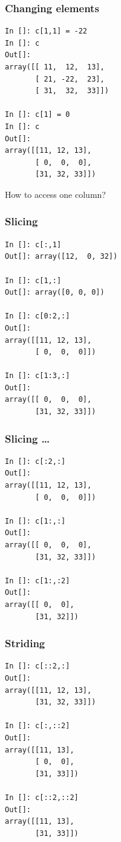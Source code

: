 \documentclass[14pt,compress]{beamer}
\begin{document}
\begin{frame}[fragile]
  \frametitle{Changing elements}
  \begin{small}
  \begin{lstlisting}
In []: c[1,1] = -22
In []: c
Out[]: 
array([[ 11,  12,  13],
       [ 21, -22,  23],
       [ 31,  32,  33]])

In []: c[1] = 0
In []: c
Out[]: 
array([[11, 12, 13],
       [ 0,  0,  0],
       [31, 32, 33]])
  \end{lstlisting}
  \end{small}
How to access one \alert{column}?
\end{frame}

\begin{frame}[fragile]
  \frametitle{Slicing}
\begin{small}
  \begin{lstlisting}
In []: c[:,1]
Out[]: array([12,  0, 32])

In []: c[1,:]
Out[]: array([0, 0, 0])

In []: c[0:2,:]
Out[]: 
array([[11, 12, 13],
       [ 0,  0,  0]])

In []: c[1:3,:]
Out[]: 
array([[ 0,  0,  0],
       [31, 32, 33]])
  \end{lstlisting}
\end{small}
\end{frame}

\begin{frame}[fragile]
  \frametitle{Slicing \ldots}
\begin{small}
  \begin{lstlisting}
In []: c[:2,:]
Out[]: 
array([[11, 12, 13],
       [ 0,  0,  0]])

In []: c[1:,:]
Out[]: 
array([[ 0,  0,  0],
       [31, 32, 33]])

In []: c[1:,:2]
Out[]: 
array([[ 0,  0],
       [31, 32]])
  \end{lstlisting}

\end{small}
\end{frame}

\begin{frame}[fragile]
  \frametitle{Striding}
  \begin{small}
  \begin{lstlisting}
In []: c[::2,:]
Out[]: 
array([[11, 12, 13],
       [31, 32, 33]])

In []: c[:,::2]
Out[]: 
array([[11, 13],
       [ 0,  0],
       [31, 33]])

In []: c[::2,::2]
Out[]: 
array([[11, 13],
       [31, 33]])
  \end{lstlisting}
  \end{small}
\end{frame}
\end{document}
